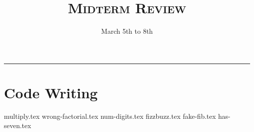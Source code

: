 \documentclass{exam}
\title{\textsc{Midterm Review}}
\date{March 5th to 8th}
\begin{document}
\maketitle
\rule{\textwidth}{0.15em}
\fontsize{12}{15}\selectfont


\section{Code Writing}
\begin{questions}
{multiply.tex}
\newpage
{wrong-factorial.tex}
\newpage
{num-digits.tex}
\newpage
{fizzbuzz.tex}
\newpage
{fake-fib.tex}
\newpage
{has-seven.tex}



\end{questions}
\end{document}
